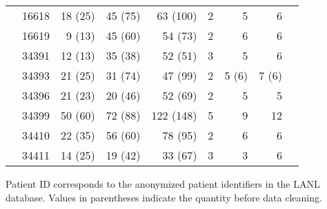 \documentclass[12pt]{article}
\begin{document}
\begin{table*}
\begin{center}
\begin{tabular}{llrrrrrrr}
& 16618 & 18 (25) & 45 (75) & 63 (100) & 2 & 5 & 6 \\
& 16619 & 9 (13) & 45 (60) & 54 (73) & 2 & 6 & 6 \\
\cite{Novitsky09}%
& 34391 & 12 (13) & 35 (38) & 52 (51) & 3 & 5 & 6 \\
& 34393 & 21 (25) & 31 (74) & 47 (99) & 2 & 5 (6) & 7 (6) \\
& 34396 & 21 (23) & 20 (46) & 52 (69) & 2 & 5 & 5 \\
& 34399 & 50 (60) & 72 (88) & 122 (148) & 5 & 9 & 12 \\
& 34410 & 22 (35) & 56 (60) & 78 (95) & 2 & 6 & 6 \\
& 34411 & 14 (25) & 19 (42) & 33 (67) & 3 & 3 & 6 \\
\hline
\end{tabular}
\end{center}
	Patient ID corresponds to the anonymized patient identifiers in the LANL database.
	Values in parentheses indicate the quantity before data cleaning.
\end{table*}

\pagebreak{}
\end{document}
